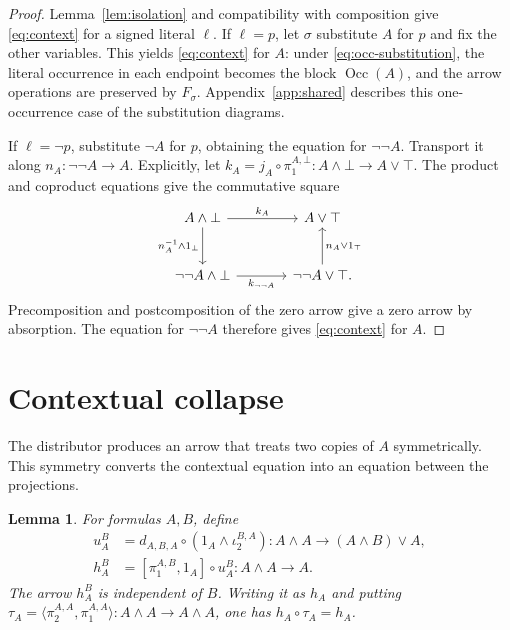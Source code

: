 \documentclass[11pt]{article}
\newtheorem{lemma}[theorem]{Lemma}
\newcommand{\Occ}{\operatorname{Occ}}
\begin{document}
\begin{proof}
Lemma~\ref{lem:isolation} and compatibility with composition give
\eqref{eq:context} for a signed literal $\ell$.
If $\ell=p$, let $\sigma$ substitute $A$ for $p$ and fix the other variables.
This yields \eqref{eq:context} for $A$: under
\eqref{eq:occ-substitution}, the literal occurrence in each endpoint
becomes the block $\Occ(A)$, and the arrow operations are preserved
by $F_\sigma$. Appendix~\ref{app:shared} describes this
one-occurrence case of the substitution diagrams.

If $\ell=\neg p$, substitute $\neg A$ for $p$, obtaining the equation
for $\neg\neg A$. Transport it along $n_A:\neg\neg A\to A$.
Explicitly, let
$k_A=j_A\circ\pi_1^{A,\bot}:A\wedge\bot\to A\vee\top$.
The product and coproduct equations give the commutative square
\[
\begin{tikzcd}[column sep=large,row sep=large]
 A\wedge\bot\arrow[r,"k_A"]\arrow[d,"n_A^{-1}\wedge1_\bot"']
   &A\vee\top\\
 \neg\neg A\wedge\bot\arrow[r,"k_{\neg\neg A}"']
   &\neg\neg A\vee\top\arrow[u,"n_A\vee1_\top"'].
\end{tikzcd}
\]
Precomposition and postcomposition of the zero arrow give a zero
arrow by absorption. The equation for $\neg\neg A$ therefore gives
\eqref{eq:context} for $A$.
\end{proof}

\section{Contextual collapse}\label{sec:collapse}

The distributor produces an arrow that treats two copies of $A$
symmetrically. This symmetry converts the contextual equation into
an equation between the projections.

\begin{lemma}\label{lem:symmetric}
For formulas $A,B$, define
\[
 \begin{aligned}
 u_A^B&=d_{A,B,A}\circ(1_A\wedge\iota_2^{B,A})
       :A\wedge A\longrightarrow(A\wedge B)\vee A,\\
 h_A^B&=[\pi_1^{A,B},1_A]\circ u_A^B:A\wedge A\longrightarrow A.
 \end{aligned}
\]
The arrow $h_A^B$ is independent of $B$. Writing it as $h_A$ and
putting $\tau_A=\langle\pi_2^{A,A},\pi_1^{A,A}\rangle:
A\wedge A\to A\wedge A$, one has
$h_A\circ\tau_A=h_A$.
\end{lemma}
\end{document}
